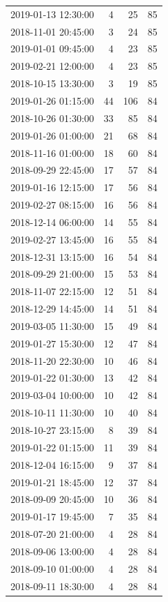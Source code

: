 \begin{tabular}{lrrr}
2019-01-13 12:30:00 & 4 & 25 & 85 \\
2018-11-01 20:45:00 & 3 & 24 & 85 \\
2019-01-01 09:45:00 & 4 & 23 & 85 \\
2019-02-21 12:00:00 & 4 & 23 & 85 \\
2018-10-15 13:30:00 & 3 & 19 & 85 \\
2019-01-26 01:15:00 & 44 & 106 & 84 \\
2018-10-26 01:30:00 & 33 & 85 & 84 \\
2019-01-26 01:00:00 & 21 & 68 & 84 \\
2018-11-16 01:00:00 & 18 & 60 & 84 \\
2018-09-29 22:45:00 & 17 & 57 & 84 \\
2019-01-16 12:15:00 & 17 & 56 & 84 \\
2019-02-27 08:15:00 & 16 & 56 & 84 \\
2018-12-14 06:00:00 & 14 & 55 & 84 \\
2019-02-27 13:45:00 & 16 & 55 & 84 \\
2018-12-31 13:15:00 & 16 & 54 & 84 \\
2018-09-29 21:00:00 & 15 & 53 & 84 \\
2018-11-07 22:15:00 & 12 & 51 & 84 \\
2018-12-29 14:45:00 & 14 & 51 & 84 \\
2019-03-05 11:30:00 & 15 & 49 & 84 \\
2019-01-27 15:30:00 & 12 & 47 & 84 \\
2018-11-20 22:30:00 & 10 & 46 & 84 \\
2019-01-22 01:30:00 & 13 & 42 & 84 \\
2019-03-04 10:00:00 & 10 & 42 & 84 \\
2018-10-11 11:30:00 & 10 & 40 & 84 \\
2018-10-27 23:15:00 & 8 & 39 & 84 \\
2019-01-22 01:15:00 & 11 & 39 & 84 \\
2018-12-04 16:15:00 & 9 & 37 & 84 \\
2019-01-21 18:45:00 & 12 & 37 & 84 \\
2018-09-09 20:45:00 & 10 & 36 & 84 \\
2019-01-17 19:45:00 & 7 & 35 & 84 \\
2018-07-20 21:00:00 & 4 & 28 & 84 \\
2018-09-06 13:00:00 & 4 & 28 & 84 \\
2018-09-10 01:00:00 & 4 & 28 & 84 \\
2018-09-11 18:30:00 & 4 & 28 & 84 \\

\end{tabular}
